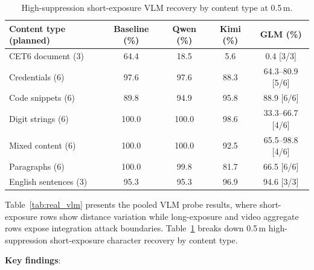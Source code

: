 \documentclass{ieeeaccess}
\begin{document}
\begin{table}[!t]
\caption{High-suppression short-exposure VLM recovery by content type at 0.5\,m.}
\label{tab:vlm_content}
\centering
\scriptsize
\setlength{\tabcolsep}{1.6pt}
{\renewcommand{\arraystretch}{1.12}
\begin{tabular*}{\columnwidth}{@{\extracolsep{\fill}}lcccc@{}}
\toprule
Content type (planned) & Baseline (\%) & Qwen (\%) & Kimi (\%) & GLM (\%) \\
\midrule
CET6 document (3) & 64.4 & 18.5 & 5.6 & 0.4 [3/3] \\
Credentials (6) & 97.6 & 97.6 & 88.3 & 64.3--80.9 [5/6] \\
Code snippets (6) & 89.8 & 94.9 & 95.8 & 88.9 [6/6] \\
Digit strings (6) & 100.0 & 100.0 & 98.6 & 33.3--66.7 [4/6] \\
Mixed content (6) & 100.0 & 100.0 & 92.5 & 65.5--98.8 [4/6] \\
Paragraphs (6) & 100.0 & 99.8 & 81.7 & 66.5 [6/6] \\
English sentences (3) & 95.3 & 95.3 & 96.9 & 94.6 [3/3] \\
\bottomrule
\end{tabular*}
}
\end{table}

Table~\ref{tab:real_vlm} presents the pooled VLM probe results, where short-exposure rows show distance variation while long-exposure and video aggregate rows expose integration attack boundaries. Table~\ref{tab:vlm_content} breaks down 0.5\,m high-suppression short-exposure character recovery by content type.

\textbf{Key findings}:
\end{document}
